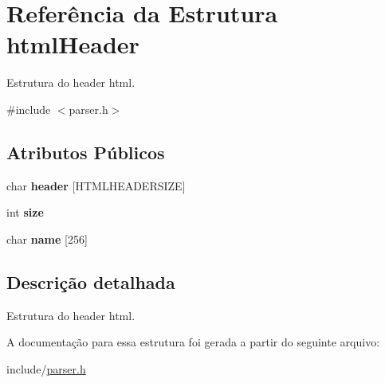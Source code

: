 \hypertarget{structhtml_header}{}\section{Referência da Estrutura html\+Header}
\label{structhtml_header}


Estrutura do header html.  




{\ttfamily \#include $<$parser.\+h$>$}

\subsection*{Atributos Públicos}
\begin{DoxyCompactItemize}
\item 
\mbox{\label{structhtml_header_a47410a95079581204d97acf1d8797b05}} 
char {\bfseries header} \mbox{[}H\+T\+M\+L\+H\+E\+A\+D\+E\+R\+S\+I\+ZE\mbox{]}
\item 
\mbox{\label{structhtml_header_af087e18195e425fe107207b24c2dc60e}} 
int {\bfseries size}
\item 
\mbox{\label{structhtml_header_acd6dd2af2e72f4bdfc7d18c2c9a68ab1}} 
char {\bfseries name} \mbox{[}256\mbox{]}
\end{DoxyCompactItemize}


\subsection{Descrição detalhada}
Estrutura do header html. 

A documentação para essa estrutura foi gerada a partir do seguinte arquivo\+:\begin{DoxyCompactItemize}
\item 
include/\mbox{\hyperlink{parser_8h}{parser.\+h}}\end{DoxyCompactItemize}
